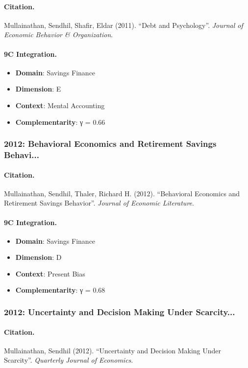 \paragraph{Citation.}
Mullainathan, Sendhil, Shafir, Eldar (2011). ``Debt and Psychology''. \textit{Journal of Economic Behavior & Organization}.

\paragraph{9C Integration.}
\begin{itemize}[nosep]
  \item \textbf{Domain}: Savings Finance
  \item \textbf{Dimension}: E
  \item \textbf{Context}: Mental Accounting
  \item \textbf{Complementarity}: γ = 0.66
\end{itemize}


\subsubsection{2012: Behavioral Economics and Retirement Savings Behavi...}

\paragraph{Citation.}
Mullainathan, Sendhil, Thaler, Richard H. (2012). ``Behavioral Economics and Retirement Savings Behavior''. \textit{Journal of Economic Literature}.

\paragraph{9C Integration.}
\begin{itemize}[nosep]
  \item \textbf{Domain}: Savings Finance
  \item \textbf{Dimension}: D
  \item \textbf{Context}: Present Bias
  \item \textbf{Complementarity}: γ = 0.68
\end{itemize}


\subsubsection{2012: Uncertainty and Decision Making Under Scarcity...}

\paragraph{Citation.}
Mullainathan, Sendhil (2012). ``Uncertainty and Decision Making Under Scarcity''. \textit{Quarterly Journal of Economics}.

